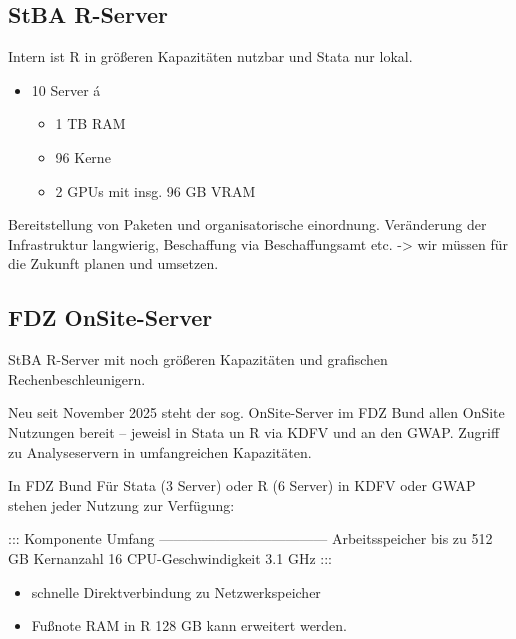 \documentclass[
  german,
  10pt,
  twoside]{article}
\providecommand{\tightlist}{%
  \setlength{\itemsep}{0pt}\setlength{\parskip}{0pt}}
\begin{document}
\subsection{StBA R-Server}\label{stba-r-server}

Intern ist R in größeren Kapazitäten nutzbar und Stata nur lokal.

\begin{itemize}
\tightlist
\item
  10 Server á

  \begin{itemize}
  \tightlist
  \item
    1 TB RAM
  \item
    96 Kerne
  \item
    2 GPUs mit insg. 96 GB VRAM
  \end{itemize}
\end{itemize}

Bereitstellung von Paketen und organisatorische einordnung. Veränderung
der Infrastruktur langwierig, Beschaffung via Beschaffungsamt etc.
-\textgreater{} wir müssen für die Zukunft planen und umsetzen.

\subsection{FDZ OnSite-Server}\label{fdz-onsite-server}

StBA R-Server mit noch größeren Kapazitäten und grafischen
Rechenbeschleunigern.

Neu seit November 2025 steht der sog. OnSite-Server im FDZ Bund allen
OnSite Nutzungen bereit -- jeweisl in Stata un R via KDFV und an den
GWAP. Zugriff zu Analyseservern in umfangreichen Kapazitäten.

In FDZ Bund Für Stata (3 Server) oder R (6 Server) in KDFV oder GWAP
stehen jeder Nutzung zur Verfügung:

::: \textbar{} Komponente \textbar{} Umfang \textbar{}
\textbar---------------------\textbar---------------\textbar{}
\textbar{} Arbeitsspeicher \textbar{} bis zu 512 GB \textbar{}
\textbar{} Kernanzahl \textbar{} 16 \textbar{} \textbar{}
CPU-Geschwindigkeit \textbar{} 3.1 GHz \textbar{} :::

\begin{itemize}
\tightlist
\item
  schnelle Direktverbindung zu Netzwerkspeicher
\item
  Fußnote RAM in R 128 GB kann erweitert werden.
\end{itemize}


\printbibliography
\end{document}
